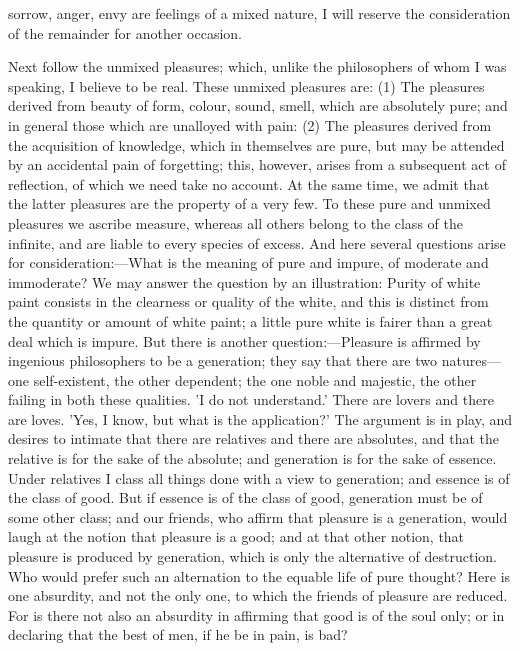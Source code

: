 \documentclass[11pt,letter]{article}
\begin{document}
sorrow, anger, envy are feelings of a mixed nature, I will reserve the consideration of the remainder for another occasion.

\par  Next follow the unmixed pleasures; which, unlike the philosophers of whom I was speaking, I believe to be real. These unmixed pleasures are: (1) The pleasures derived from beauty of form, colour, sound, smell, which are absolutely pure; and in general those which are unalloyed with pain: (2) The pleasures derived from the acquisition of knowledge, which in themselves are pure, but may be attended by an accidental pain of forgetting; this, however, arises from a subsequent act of reflection, of which we need take no account. At the same time, we admit that the latter pleasures are the property of a very few. To these pure and unmixed pleasures we ascribe measure, whereas all others belong to the class of the infinite, and are liable to every species of excess. And here several questions arise for consideration:—What is the meaning of pure and impure, of moderate and immoderate? We may answer the question by an illustration: Purity of white paint consists in the clearness or quality of the white, and this is distinct from the quantity or amount of white paint; a little pure white is fairer than a great deal which is impure. But there is another question:—Pleasure is affirmed by ingenious philosophers to be a generation; they say that there are two natures—one self-existent, the other dependent; the one noble and majestic, the other failing in both these qualities. 'I do not understand.' There are lovers and there are loves. 'Yes, I know, but what is the application?' The argument is in play, and desires to intimate that there are relatives and there are absolutes, and that the relative is for the sake of the absolute; and generation is for the sake of essence. Under relatives I class all things done with a view to generation; and essence is of the class of good. But if essence is of the class of good, generation must be of some other class; and our friends, who affirm that pleasure is a generation, would laugh at the notion that pleasure is a good; and at that other notion, that pleasure is produced by generation, which is only the alternative of destruction. Who would prefer such an alternation to the equable life of pure thought? Here is one absurdity, and not the only one, to which the friends of pleasure are reduced. For is there not also an absurdity in affirming that good is of the soul only; or in declaring that the best of men, if he be in pain, is bad?
\end{document}
